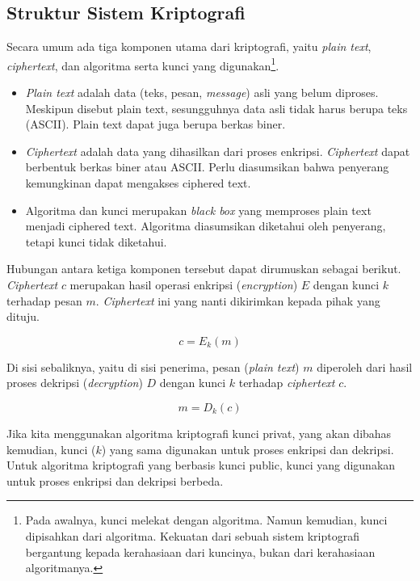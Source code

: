 \subsection{Struktur Sistem Kriptografi}
Secara umum ada tiga komponen utama dari kriptografi, yaitu {\em plain text},
{\em ciphertext}, dan algoritma serta kunci yang digunakan\footnote{Pada
awalnya, kunci melekat dengan algoritma. Namun kemudian, kunci dipisahkan dari
algoritma. Kekuatan dari sebuah sistem kriptografi bergantung kepada
kerahasiaan dari kuncinya, bukan dari kerahasiaan algoritmanya.}.
\begin{itemize}
  \item {\em Plain text} adalah data (teks, pesan, {\em message}) asli yang
  belum diproses. Meskipun disebut plain text, sesungguhnya data asli tidak
  harus berupa teks (ASCII). Plain text dapat juga berupa berkas biner.
  \item {\em Ciphertext} adalah data yang dihasilkan dari proses enkripsi.
     {\em Ciphertext} dapat berbentuk berkas biner atau ASCII. Perlu diasumsikan
  bahwa penyerang kemungkinan dapat mengakses ciphered text.
  \item Algoritma dan kunci merupakan {\em black box} yang memproses plain text
  menjadi ciphered text. Algoritma diasumsikan diketahui oleh penyerang,
  tetapi kunci tidak diketahui.
\end{itemize}

Hubungan antara ketiga komponen tersebut dapat dirumuskan sebagai berikut.
{\em Ciphertext} $c$ merupakan hasil operasi enkripsi ({\em encryption}) $E$ 
dengan kunci $k$ terhadap pesan $m$. {\em Ciphertext} ini yang nanti dikirimkan
kepada pihak yang dituju.

\begin{equation}
   c = E_k(m)
\end{equation}

Di sisi sebaliknya, yaitu di sisi penerima, pesan ({\em plain text}) $m$
diperoleh dari hasil proses dekripsi ({\em decryption}) $D$ dengan kunci $k$
terhadap {\em ciphertext} $c$.

\begin{equation}
   m = D_k(c)
\end{equation}

Jika kita menggunakan algoritma kriptografi kunci privat, yang akan dibahas
kemudian, kunci ($k$) yang sama digunakan untuk proses enkripsi dan dekripsi.
Untuk algoritma kriptografi yang berbasis kunci public, kunci yang digunakan
untuk proses enkripsi dan dekripsi berbeda.


